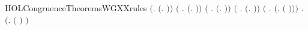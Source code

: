 \newcommand{\HOLCongruenceTheoremsWGXXind}{\UseVerbatim{HOLCongruenceTheoremsWGXXind}}
\begin{SaveVerbatim}{HOLCongruenceTheoremsWGXXrules}
\HOLTokenTurnstile{} \ensuremath{(}\HOLSymConst{\HOLTokenForall{}}.  \ensuremath{(}\HOLTokenLambda{}. \ensuremath{)}\ensuremath{)} \HOLSymConst{\HOLTokenConj{}} \ensuremath{(}\HOLSymConst{\HOLTokenForall{}} .   \HOLSymConst{\HOLTokenImp{}}  \ensuremath{(}\HOLTokenLambda{}. \HOLSymConst{\ensuremath{\ldotp}} \ensuremath{)}\ensuremath{)} \HOLSymConst{\HOLTokenConj{}}
   \ensuremath{(}\HOLSymConst{\HOLTokenForall{}} .   \HOLSymConst{\HOLTokenConj{}}   \HOLSymConst{\HOLTokenImp{}}  \ensuremath{(}\HOLTokenLambda{}.   \HOLSymConst{\ensuremath{+}}  \ensuremath{)}\ensuremath{)} \HOLSymConst{\HOLTokenConj{}}
   \ensuremath{(}\HOLSymConst{\HOLTokenForall{}} .   \HOLSymConst{\HOLTokenConj{}}   \HOLSymConst{\HOLTokenImp{}}  \ensuremath{(}\HOLTokenLambda{}.   \HOLSymConst{\ensuremath{\mid}}  \ensuremath{)}\ensuremath{)} \HOLSymConst{\HOLTokenConj{}}
   \ensuremath{(}\HOLSymConst{\HOLTokenForall{}} .   \HOLSymConst{\HOLTokenImp{}}  \ensuremath{(}\HOLTokenLambda{}.   \ensuremath{(} \ensuremath{)}\ensuremath{)}\ensuremath{)} \HOLSymConst{\HOLTokenConj{}}
   \HOLSymConst{\HOLTokenForall{}} .   \HOLSymConst{\HOLTokenImp{}}  \ensuremath{(}\HOLTokenLambda{}.  \ensuremath{(} \ensuremath{)} \ensuremath{)}
\end{SaveVerbatim}
\newcommand{\HOLCongruenceTheoremsWGXXrules}{\UseVerbatim{HOLCongruenceTheoremsWGXXrules}}
